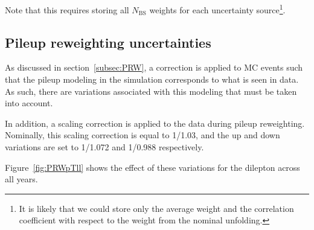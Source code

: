 Note that this requires storing all $N_\mathrm{BS}$ weights for each uncertainty source\footnote{It is likely that we could store only the average weight and the correlation coefficient with respect to the weight from the nominal unfolding.}.


\subsection{Pileup reweighting uncertainties}
As discussed in section~\ref{subsec:PRW}, a correction is applied to MC events such that the pileup modeling in the simulation corresponds to what is seen in data. As such, there are variations associated with this modeling
that must be taken into account.

In addition, a scaling correction is applied to the data during pileup reweighting. Nominally, this scaling correction is equal to 1/1.03, and the up and down variations are set to 1/1.072 and 1/0.988 respectively.

Figure~\ref{fig:PRWpTll} shows the effect of these variations for the dilepton \pt across all years.

